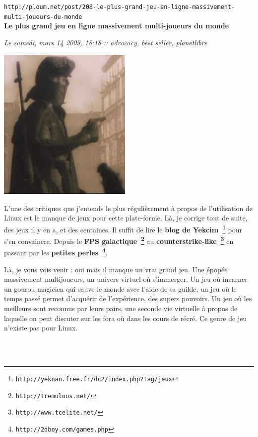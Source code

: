 \documentclass[11pt,twoside,a4paper]{article}
\begin{document}
\setlength\parindent{0pt}

\texttt{http://ploum.net/post/208-le-plus-grand-jeu-en-ligne-massivement-multi-joueurs-du-monde}~\\

\textbf{\LARGE Le plus grand jeu en ligne massivement multi-joueurs du monde}

\emph{\small Le samedi, mars 14 2009, 18:18 :: advocacy, best seller, planetlibre}

\begin{minipage}[ht]{6.5cm}
	\includegraphics[width=6.45cm]{img/avalon.jpg}
\end{minipage} \hfill \begin{minipage}[ht]{0.65\textwidth}
	L'une des critiques que j'entends le plus r{\'e}guli{\`e}rement {\`a} propos de l'utilisation de Linux est le manque de jeux pour cette plate-forme. L{\`a}, je corrige tout de suite, des jeux il y en a, et des centaines. Il suffit de lire le \textbf{blog de Yekcim~\footnote{\texttt{http://yeknan.free.fr/dc2/index.php?tag/jeux}}} pour s'en convaincre. Depuis le \textbf{FPS galactique~\footnote{\texttt{http://tremulous.net/}}} au  \textbf{counterstrike-like~\footnote{\texttt{http://www.tcelite.net/}}} en passant par les \textbf{petites perles~\footnote{\texttt{http://2dboy.com/games.php}}}.

	L{\`a}, je vous vois venir : oui mais il manque un vrai grand jeu. Une {\'e}pop{\'e}e massivement multijoueurs, un univers virtuel o{\`u} s'immerger. Un jeu o{\`u} incarner un gourou magicien qui sauve le monde avec l'aide de sa guilde, un jeu o{\`u} le temps pass{\'e} permet d'acqu{\'e}rir de l'exp{\'e}rience, des supers pouvoirs. Un jeu o{\`u} les meilleurs sont reconnus par leurs pairs, une seconde vie virtuelle {\`a} propos de laquelle on peut discuter sur les fora o{\`u} dans les cours de r{\'e}cr{\'e}. Ce genre de jeu n'existe pas pour Linux.~\\
\end{minipage}~\\~\\
\end{document}
